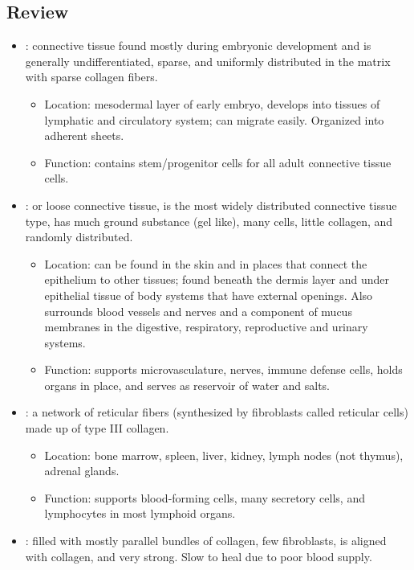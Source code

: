 \begin{itemize}
  \subsection{Review}
  \begin{itemize}
    \item {}: connective tissue found mostly during embryonic development and is generally undifferentiated, sparse, and uniformly distributed in the matrix with sparse collagen fibers.
    \begin{itemize}
      \item Location: mesodermal layer of early embryo, develops into tissues of lymphatic and circulatory system; can migrate easily. Organized into adherent sheets.
      \item Function: contains stem/progenitor cells for all adult connective tissue cells.
    \end{itemize}
    \item {}: or loose connective tissue, is the most widely distributed connective tissue type, has much ground substance (gel like), many cells, little collagen, and randomly distributed.
    \begin{itemize}
      \item Location: can be found in the skin and in places that connect the epithelium to other tissues; found beneath the dermis layer and under epithelial tissue of body systems that have external openings. Also surrounds blood vessels and nerves and a component of mucus membranes in the digestive, respiratory, reproductive and urinary systems.
      \item Function: supports microvasculature, nerves, immune defense cells, holds organs in place, and serves as reservoir of water and salts.
    \end{itemize}
    \item {}: a network of reticular fibers (synthesized by fibroblasts called reticular cells) made up of type III collagen.
    \begin{itemize}
      \item Location: bone marrow, spleen, liver, kidney, lymph nodes (not thymus), adrenal glands.
      \item Function: supports blood-forming cells, many secretory cells, and lymphocytes in most lymphoid organs.
    \end{itemize}
    \item {}: filled with mostly parallel bundles of collagen, few fibroblasts, is aligned with collagen, and very strong. Slow to heal due to poor blood supply.

\end{itemize}
\end{itemize}
